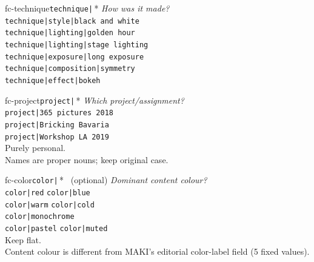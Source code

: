 \documentclass[a3paper,landscape,10pt]{article}
\newcommand{\cmd}[1]{\texttt{\small #1}}
\begin{document}
\begin{minipage}[t]{0.64\textwidth}
  \noindent
  \begin{minipage}[t]{0.244\textwidth}\begin{facetcard}{fc-technique}{\texttt{technique|}\,*}
    \textit{\small How was it made?}\\[3pt]
    \scriptsize
    \cmd{technique|style|black and white}\\
    \cmd{technique|lighting|golden hour}\\
    \cmd{technique|lighting|stage lighting}\\
    \cmd{technique|exposure|long exposure}\\
    \cmd{technique|composition|symmetry}\\
    \cmd{technique|effect|bokeh}
  \end{facetcard}\end{minipage}\hfill
  \begin{minipage}[t]{0.244\textwidth}\begin{facetcard}{fc-project}{\texttt{project|}\,*}
    \textit{\small Which project/assignment?}\\[3pt]
    \scriptsize
    \cmd{project|365 pictures 2018}\\
    \cmd{project|Bricking Bavaria}\\
    \cmd{project|Workshop LA 2019}\\[2pt]
    {\color{maki-stone} Purely personal.\\
    Names are proper nouns; keep original case.}
  \end{facetcard}\end{minipage}\hfill
  \begin{minipage}[t]{0.244\textwidth}\begin{facetcard}{fc-color}{\texttt{color|}\,* \ \scriptsize(optional)}
    \textit{\small Dominant content colour?}\\[3pt]
    \scriptsize
    \cmd{color|red} \quad \cmd{color|blue}\\
    \cmd{color|warm} \quad \cmd{color|cold}\\
    \cmd{color|monochrome}\\
    \cmd{color|pastel} \quad \cmd{color|muted}\\[2pt]
    {\color{maki-stone} Keep flat.\\
    Content colour is different from MAKI's editorial
    color-label field (5 fixed values).}
  \end{facetcard}\end{minipage}\hfill

\end{minipage}
\end{document}

